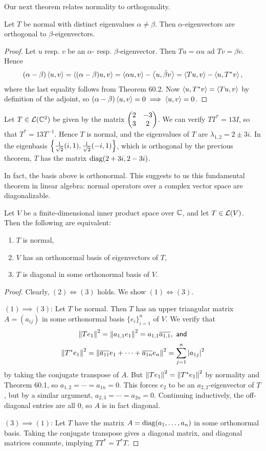 \documentclass{article}
\begin{document}
Our next theorem relates normality to orthogonality.
\begin{theorem}
Let $T$ be normal with distinct eigenvalues $\alpha \neq \beta$. Then $\alpha$-eigenvectors are orthogonal to $\beta$-eigenvectors.
\end{theorem}
\begin{proof}
Let $u$ resp. $v$ be an $\alpha$- resp. $\beta$-eigenvector. Then $Tu = \alpha u$ ad $Tv = \beta v$. Hence
$$(\alpha-\beta)\left\langle u,v\right\rangle = \left\langle(\alpha-\beta)u, v\right\rangle = \left\langle\alpha u, v\right\rangle - \left\langle u,\bar\beta v\right\rangle = \left\langle Tu, v\right\rangle - \left\langle u,T^*v\right\rangle,$$
where the last equality follows from Theorem 60.2. Now $\left\langle u, T^*v\right\rangle = \left\langle Tu, v\right\rangle$ by definition of the adjoint, so $(\alpha-\beta)\left\langle u,v\right\rangle = 0 \implies \left\langle u,v\right\rangle = 0$.
\end{proof}
\begin{example}
Let $T\in\mathcal L(\mathbb C^2)$ be given by the matrix $\begin{pmatrix}2 & -3 \\ 3 & 2 \end{pmatrix}$. We can verify $TT^* = 13I$, so that $T^* = 13T^{-1}$. Hence $T$ is normal, and the eigenvalues of $T$ are $\lambda_{1,2} = 2\pm 3i$. In the eigenbasis $\left\{\frac 1{\sqrt 2}(i, 1), \frac 1{\sqrt 2}(-i, 1)\right\}$, which is orthogonal by the previous theorem, $T$ has the matrix $\operatorname{diag}(2 + 3i, 2-3i)$.
\end{example}
In fact, the basis above is orthonormal. This suggests to us this fundamental theorem in linear algebra: normal operators over a complex vector space are diagonalizable.
\begin{theorem}
Let $V$ be a finite-dimensional inner product space over $\mathbb C$, and let $T\in\mathcal L(V)$. Then the following are equivalent:
\begin{enumerate}
    \item $T$ is normal,
    \item $V$ has an orthonormal basis of eigenvectors of $T$,
    \item $T$ is diagonal in some orthonormal basis of $V$.
\end{enumerate}
\end{theorem}
\begin{proof}
Clearly, $(2)\iff (3)$ holds. We show $(1)\iff (3)$.

$(1)\implies (3)$: Let $T$ be normal. Then $T$ has an upper triangular matrix $A = (a_{ij})$ in some orthonormal basis $\{e_i\}_{i=1}^n$ of $V$. We verify that
\newpage
$$\left\Vert Te_1\right\Vert^2 = \left\Vert a_{1,1}e_1\right\Vert^2 = a_{1,1}\overline{a_{1,1}}, \textsf{ and}$$
$$\left\Vert T^*e_1\right\Vert^2 = \left\Vert \overline{a_{11}}e_1 + \cdots + \overline{a_{1n}}e_n\right\Vert^2 = \sum_{j=1}^n \left|a_{1j}\right|^2$$
by taking the conjugate transpose of $A$. But $\left\Vert Te_1\right\Vert^2 = \left\Vert T^*e_1\right\Vert^2$ by normality and Theorem 60.1, so $a_{1,2} = \cdots = a_{1n} = 0$. This forces $e_2$ to be an $a_{2,2}$-eigenvector of $T$, but by a similar argument, $a_{2,3} = \cdots = a_{2n} = 0$. Continuing inductively, the off-diagonal entries are all $0$, so $A$ is in fact diagonal.

$(3)\implies (1)$: Let $T$ have the matrix $A= \operatorname{diag}(a_1, \ldots, a_n)$ in some orthonormal basis. Taking the conjugate transpose gives a diagonal matrix, and diagonal matrices commute, implying $TT^* = T^*T$.
\end{proof}
\end{document}
